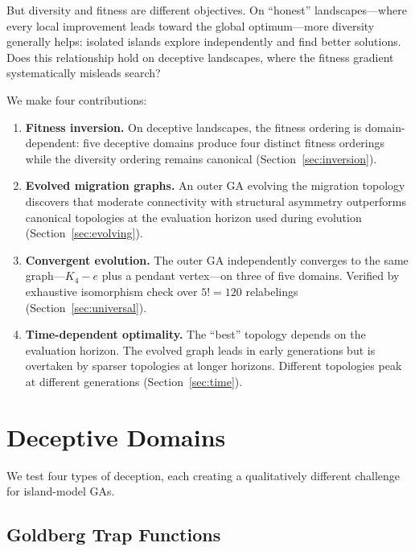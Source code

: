 \documentclass[sigconf,nonacm]{acmart}
\begin{document}
But diversity and fitness are different objectives. On ``honest''
landscapes---where every local improvement leads toward the global
optimum---more diversity generally helps: isolated islands explore
independently and find better solutions. Does this relationship hold
on deceptive landscapes, where the fitness gradient systematically
misleads search?

We make four contributions:

\begin{enumerate}
\item \textbf{Fitness inversion.} On deceptive landscapes, the fitness
  ordering is domain-dependent: five deceptive domains produce four
  distinct fitness orderings while the diversity ordering remains
  canonical (Section~\ref{sec:inversion}).

\item \textbf{Evolved migration graphs.} An outer GA evolving the
  migration topology discovers that moderate connectivity with
  structural asymmetry outperforms canonical topologies at the
  evaluation horizon used during evolution
  (Section~\ref{sec:evolving}).

\item \textbf{Convergent evolution.} The outer GA independently
  converges to the same graph---$K_4 - e$ plus a pendant vertex---on
  three of five domains. Verified by exhaustive isomorphism check
  over $5! = 120$ relabelings (Section~\ref{sec:universal}).

\item \textbf{Time-dependent optimality.} The ``best'' topology
  depends on the evaluation horizon. The evolved graph leads in early
  generations but is overtaken by sparser topologies at longer
  horizons. Different topologies peak at different generations
  (Section~\ref{sec:time}).
\end{enumerate}


\section{Deceptive Domains}
\label{sec:domains}

We test four types of deception, each creating a qualitatively
different challenge for island-model GAs.

\subsection{Goldberg Trap Functions}
\end{document}
